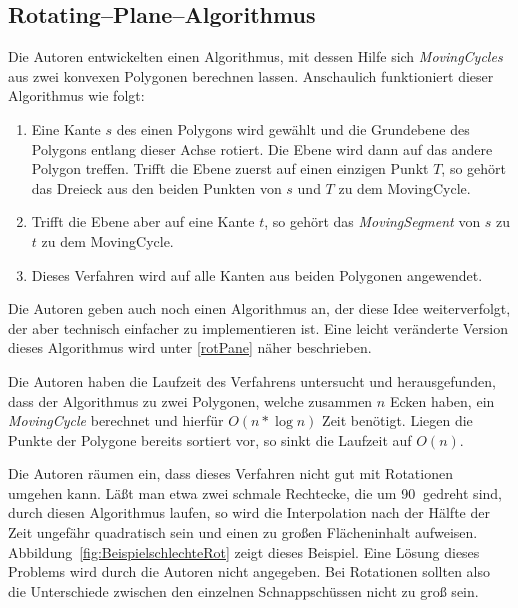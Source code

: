 \subsection{Rotating--Plane--Algorithmus}

Die Autoren entwickelten einen Algorithmus, mit dessen Hilfe sich \textit{MovingCycles} aus zwei konvexen Polygonen berechnen lassen. Anschaulich funktioniert dieser Algorithmus wie folgt:

\begin{enumerate}

\item Eine Kante $s$ des einen Polygons wird gewählt und die Grundebene des Polygons entlang dieser Achse rotiert. Die Ebene wird dann auf das andere Polygon treffen. Trifft die Ebene zuerst auf einen einzigen Punkt $T$, so gehört das Dreieck aus den beiden Punkten von $s$ und $T$ zu dem MovingCycle.

\item Trifft die Ebene aber auf eine Kante $t$, so gehört das \textit{MovingSegment} von $s$ zu $t$ zu dem MovingCycle.

\item Dieses Verfahren wird auf alle Kanten aus beiden Polygonen angewendet.
\end{enumerate}
Die Autoren geben auch noch einen Algorithmus an, der diese Idee weiterverfolgt, der aber technisch einfacher zu implementieren ist. Eine leicht veränderte Version dieses Algorithmus wird unter \vref{rotPane} näher beschrieben.

Die Autoren haben die Laufzeit des Verfahrens untersucht und herausgefunden, dass der Algorithmus zu zwei Polygonen, welche zusammen $n$ Ecken haben, ein \textit{MovingCycle} berechnet und hierfür $O(n*\log{n})$ Zeit benötigt. Liegen die Punkte der Polygone bereits sortiert vor, so sinkt die Laufzeit auf $O(n)$.


\label{ProblemeRotation}Die Autoren räumen ein, dass dieses Verfahren nicht gut mit Rotationen umgehen kann. Läßt man etwa zwei schmale Rechtecke, die um 90\degree$\:$ gedreht sind, durch diesen Algorithmus laufen, so wird die Interpolation nach der Hälfte der Zeit ungefähr quadratisch  sein und einen zu großen Flächeninhalt aufweisen. Abbildung~\vref{fig:BeispielschlechteRot} zeigt dieses Beispiel. Eine Lösung dieses Problems wird durch die Autoren nicht angegeben. Bei Rotationen sollten also die Unterschiede zwischen den einzelnen Schnappschüssen nicht zu groß sein.

